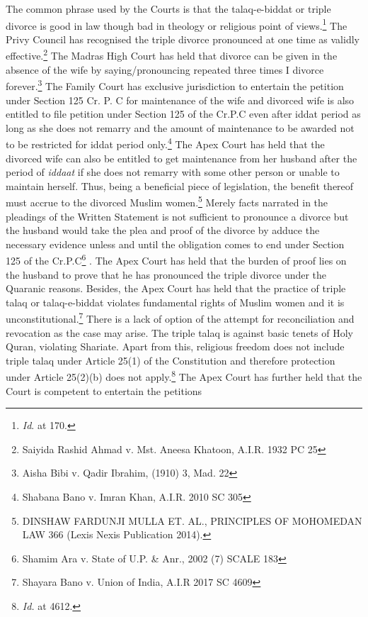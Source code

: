 \begin{multicols}{2}

\noi
The common phrase used by the Courts is that the talaq-e-biddat or triple divorce is good in
law though bad in theology or religious point of views.\footnote{{\it Id}. at 170.} The Privy Council has recognised
the triple divorce pronounced at one time as validly effective.\footnote{Saiyida Rashid Ahmad v. Mst. Aneesa Khatoon, A.I.R. 1932 PC 25} The Madras High Court has
held that divorce can be given in the absence of the wife by saying/pronouncing repeated
three times I divorce forever.\footnote{Aisha Bibi v. Qadir Ibrahim, (1910) 3, Mad. 22} The Family Court has exclusive jurisdiction to entertain the
petition under Section 125 Cr. P. C for maintenance of the wife and divorced wife is also
entitled to file petition under Section 125 of the Cr.P.C even after iddat period as long as she
does not remarry and the amount of maintenance to be awarded not to be restricted for iddat
period only.\footnote{Shabana Bano v. Imran Khan, A.I.R. 2010 SC 305} The Apex Court has held that the divorced wife can also be entitled to get
maintenance from her husband after the period of {\it iddaat} if she does not remarry with some other person or unable to maintain herself. Thus, being a beneficial piece of legislation, the
benefit thereof must accrue to the divorced Muslim women.\footnote{DINSHAW FARDUNJI MULLA ET. AL., PRINCIPLES OF MOHOMEDAN LAW 366 (Lexis Nexis
Publication 2014).} Merely facts narrated in the
pleadings of the Written Statement is not sufficient to pronounce a divorce but the husband
would take the plea and proof of the divorce by adduce the necessary evidence unless and
until the obligation comes to end under Section 125 of the Cr.P.C\footnote{Shamim Ara v. State of U.P. \& Anr., 2002 (7) SCALE 183}
.
\noi
The Apex Court has held that the burden of proof lies on the husband to prove that he has
pronounced the triple divorce under the Quaranic reasons. Besides, the Apex Court has held
that the practice of triple talaq or talaq-e-biddat violates fundamental rights of Muslim
women and it is unconstitutional.\footnote{Shayara Bano v. Union of India, A.I.R 2017 SC 4609} There is a lack of option of the attempt for reconciliation
and revocation as the case may arise. The triple talaq is against basic tenets of Holy Quran,
violating Shariate. Apart from this, religious freedom does not include triple talaq under
Article 25(1) of the Constitution and therefore protection under Article 25(2)(b) does not
apply.\footnote{{\it Id.} at 4612.} The Apex Court has further held that the Court is competent to entertain the petitions

\end{multicols}
